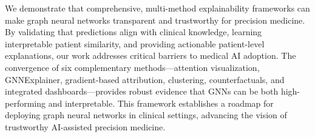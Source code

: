 We demonstrate that comprehensive, multi-method explainability frameworks can make graph neural networks transparent and trustworthy for precision medicine. By validating that \giman{} predictions align with clinical knowledge, learning interpretable patient similarity, and providing actionable patient-level explanations, our work addresses critical barriers to medical AI adoption\cite{amann2020explainability,holzinger2019causability}. The convergence of six complementary methods—attention visualization, GNNExplainer, gradient-based attribution, clustering, counterfactuals, and integrated dashboards—provides robust evidence that GNNs can be both high-performing and interpretable. This framework establishes a roadmap for deploying graph neural networks in clinical settings, advancing the vision of trustworthy AI-assisted precision medicine.
